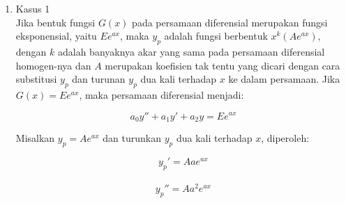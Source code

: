 \begin{enumerate}[1.] 

	\item Kasus 1 \\
	
	Jika bentuk fungsi \begin{math} G(x) \end{math} pada persamaan diferensial merupakan fungsi eksponensial, yaitu \begin{math} Ee^{ax} \end{math}, maka \begin{math} y_p \end{math} adalah fungsi berbentuk \begin{math} x^{k} (Ae^{ax}) \end{math}, 	dengan \begin{math} k \end{math} adalah banyaknya akar yang sama pada persamaan diferensial homogen-nya dan \begin{math} A \end{math} merupakan koefisien tak tentu yang dicari dengan cara substitusi \begin{math} y_p \end{math} dan turunan \begin{math} y_p \end{math} dua kali terhadap \begin{math} x \end{math} ke dalam persamaan. Jika \begin{math} G(x) = Ee^{ax} \end{math}, maka persamaan diferensial menjadi:

	\begin{equation} a_0 y'' + a_1 y' + a_2 y = Ee^{ax} \end{equation}

	Misalkan \begin{math} y_p = Ae^{ax} \end{math} dan turunkan \begin{math} y_p \end{math} dua kali terhadap \begin{math} x \end{math}, diperoleh:

	\begin{equation} y_p' = Aae^{ax} \end{equation} \\
	\begin{equation} y_p'' = Aa^{2}e^{ax} \end{equation} \\


\end{enumerate}
